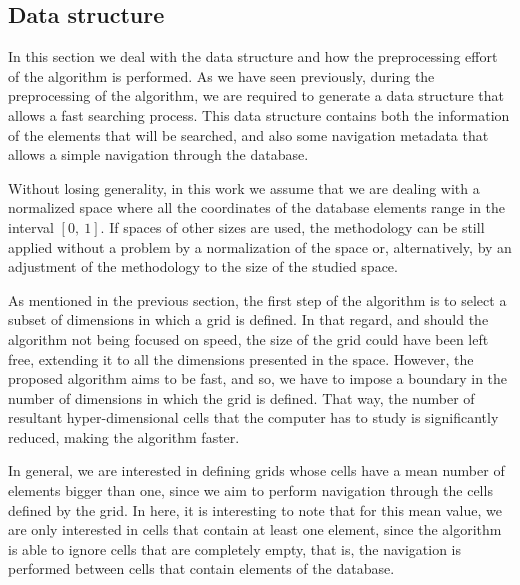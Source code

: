 \documentclass[preprint,12pt]{elsarticle}
\begin{document}
\subsection{Data structure}
\label{sec:structure}

In this section we deal with the data structure and how the preprocessing effort of the algorithm is performed. As we have seen previously, during the preprocessing of the algorithm, we are required to generate a data structure that allows a fast searching process. This data structure contains both the information of the elements that will be searched, and also some navigation metadata that allows a simple navigation through the database.

Without losing generality, in this work we assume that we are dealing with a normalized space where all the coordinates of the database elements range in the interval $[0,\: 1]$. If spaces of other sizes are used, the methodology can be still applied without a problem by a normalization of the space or, alternatively, by an adjustment of the methodology to the size of the studied space.

As mentioned in the previous section, the first step of the algorithm is to select a subset of dimensions in which a grid is defined. In that regard, and should the algorithm not being focused on speed, the size of the grid could have been left free, extending it to all the dimensions presented in the space. However, the proposed algorithm aims to be fast, and so, we have to impose a boundary in the number of dimensions in which the grid is defined. That way, the number of resultant hyper-dimensional cells that the computer has to study is significantly reduced, making the algorithm faster.

In general, we are interested in defining grids whose cells have a mean number of elements bigger than one, since we aim to perform navigation through the cells defined by the grid. In here, it is interesting to note that for this mean value, we are only interested in cells that contain at least one element, since the algorithm is able to ignore cells that are completely empty, that is, the navigation is performed between cells that contain elements of the database. 
\end{document}
